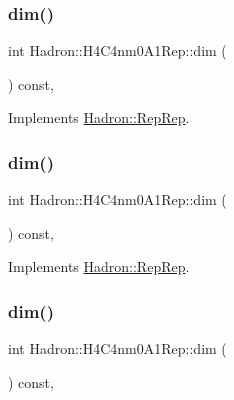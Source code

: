 \subsubsection{\texorpdfstring{dim()}{dim()}\hspace{0.1cm}{\footnotesize\ttfamily [3/5]}}
{\footnotesize\ttfamily int Hadron\+::\+H4\+C4nm0\+A1\+Rep\+::dim (\begin{DoxyParamCaption}{ }\end{DoxyParamCaption}) const\hspace{0.3cm}{\ttfamily [inline]}, {\ttfamily [virtual]}}



Implements \mbox{\hyperlink{structHadron_1_1RepRep_a92c8802e5ed7afd7da43ccfd5b7cd92b}{Hadron\+::\+Rep\+Rep}}.

\mbox{\label{structHadron_1_1H4C4nm0A1Rep_af2f93214ff5002d0da3121eb9c254fb4}} 
\subsubsection{\texorpdfstring{dim()}{dim()}\hspace{0.1cm}{\footnotesize\ttfamily [4/5]}}
{\footnotesize\ttfamily int Hadron\+::\+H4\+C4nm0\+A1\+Rep\+::dim (\begin{DoxyParamCaption}{ }\end{DoxyParamCaption}) const\hspace{0.3cm}{\ttfamily [inline]}, {\ttfamily [virtual]}}



Implements \mbox{\hyperlink{structHadron_1_1RepRep_a92c8802e5ed7afd7da43ccfd5b7cd92b}{Hadron\+::\+Rep\+Rep}}.

\mbox{\label{structHadron_1_1H4C4nm0A1Rep_af2f93214ff5002d0da3121eb9c254fb4}} 
\subsubsection{\texorpdfstring{dim()}{dim()}\hspace{0.1cm}{\footnotesize\ttfamily [5/5]}}
{\footnotesize\ttfamily int Hadron\+::\+H4\+C4nm0\+A1\+Rep\+::dim (\begin{DoxyParamCaption}{ }\end{DoxyParamCaption}) const\hspace{0.3cm}{\ttfamily [inline]}, {\ttfamily [virtual]}}



